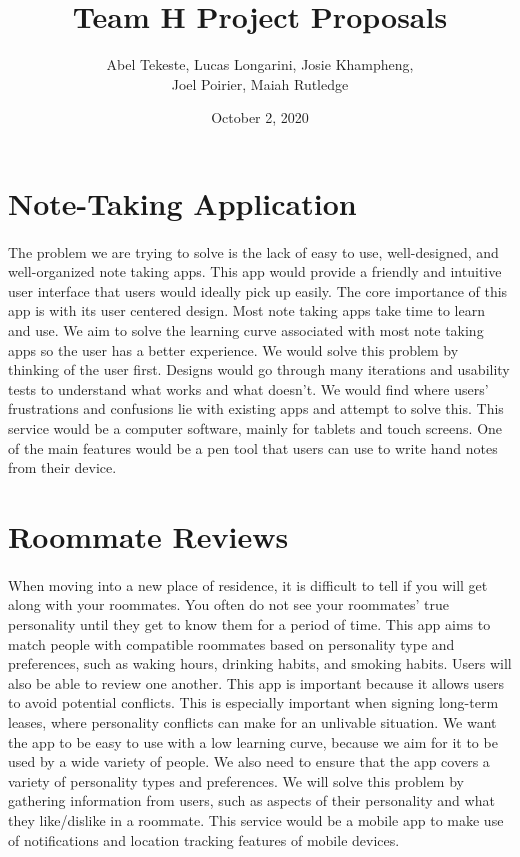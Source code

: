 \documentclass{article}
\title{Team H Project Proposals}
\author{Abel Tekeste, Lucas Longarini, Josie Khampheng,
\\Joel Poirier, Maiah Rutledge}
\date{October 2, 2020}
\begin{document}
\maketitle

\section{Note-Taking Application}
\paragraph{}
The problem we are trying to solve is the lack of easy to use, well-designed, and well-organized note taking apps. This app would provide a friendly and intuitive user interface that users would ideally pick up easily.
The core importance of this app is with its user centered design. Most note taking apps take time to learn and use. We aim to solve the learning curve associated with most note taking apps so the user has a better experience.
We would solve this problem by thinking of the user first. Designs would go through many iterations and usability tests to understand what works and what doesn’t.
We would find where users' frustrations and confusions lie with existing apps and attempt to solve this. This service would be a computer software, mainly for tablets and touch screens.
One of the main features would be a pen tool that users can use to write hand notes from their device.

\section{Roommate Reviews}
\paragraph{}
When moving into a new place of residence, it is difficult to tell if you will get along with your roommates.  You often do not see your roommates' true personality until they get to know them for a period of time.
This app aims to match people with compatible roommates based on personality type and preferences, such as waking hours, drinking habits, and smoking habits. Users will also be able to review one another.
This app is important because it allows users to avoid potential conflicts. This is especially important when signing long-term leases, where personality conflicts can make for an unlivable situation.
We want the app to be easy to use with a low learning curve, because we aim for it to be used by a wide variety of people. We also need to ensure that the app covers a variety of personality types and preferences.
We will solve this problem by gathering information from users, such as aspects of their personality and what they like/dislike in a roommate. 
This service would be a mobile app to make use of notifications and location tracking features of mobile devices.
\end{document}
